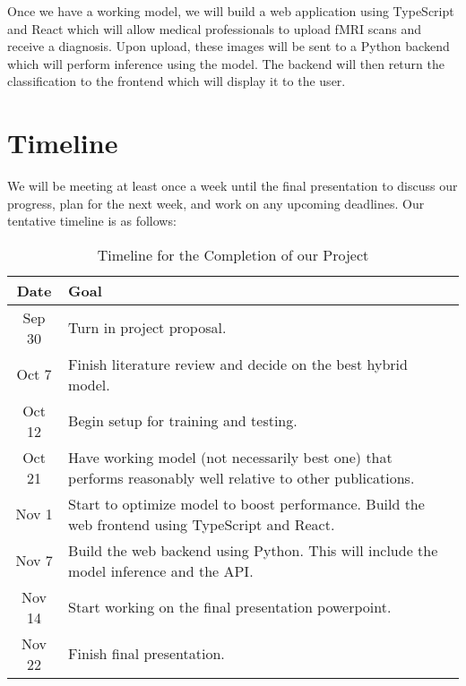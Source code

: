 \documentclass[10pt]{article}
\begin{document}
	Once we have a working model, we will build a web application using TypeScript and React which will allow medical professionals to upload fMRI scans and receive a diagnosis. Upon upload, these images will be sent to a Python backend which will perform inference using the model. The backend will then return the classification to the frontend which will display it to the user.

	\pagebreak
	\section{Timeline}
	We will be meeting at least once a week until the final presentation to discuss our progress, plan for the next week, and work on any upcoming deadlines. Our tentative timeline is as follows:
	\begin{table}[!ht]
		\centering
		\begin{tabular}{|| c | p{80mm} ||} 
			\hline
			Date & Goal \\ [0.5ex] 
			\hline\hline
			Sep 30 & Turn in project proposal. \\ [0.5ex]
			\hline
			Oct 7 & Finish literature review and decide on the best hybrid model. \\ [0.5ex]
			\hline
			Oct 12 & Begin setup for training and testing. \\ [0.5ex]
			\hline
			Oct 21 & Have working model (not necessarily best one) that performs reasonably well relative to other publications. \\ [0.5ex]
			\hline
			Nov 1 & Start to optimize model to boost performance. Build the web frontend using TypeScript and React.\\ [0.5ex]
			\hline
			Nov 7 & Build the web backend using Python. This will include the model inference and the API. \\ [0.5ex]
			\hline
			Nov 14 & Start working on the final presentation powerpoint. \\ [0.5ex]
			\hline
			Nov 22 & Finish final presentation. \\ [0.5ex]
			\hline
		\end{tabular}
		\caption{\label{tab:timeline} Timeline for the Completion of our Project}
	\end{table}

    
	
	
\end{document}
